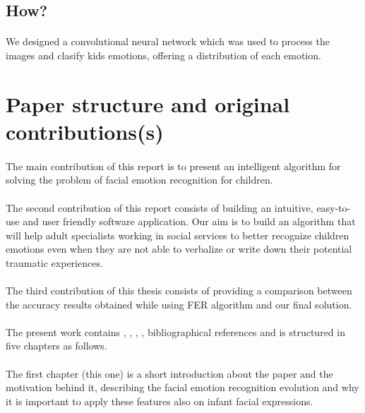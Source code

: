 \documentclass[runningheads,a4paper,11pt]{report}
\begin{document}
\subsection{How?}
\label{subsection:how}
\paragraph{}
We designed a convolutional neural network which was used to process the images and clasify kids emotions, offering a distribution of each emotion.

\section{Paper structure and original contributions(s)}
\label{section:structure}
\paragraph{}
The main contribution of this report is to present an intelligent algorithm for solving the problem of facial emotion recognition for children.

\paragraph{}
The second contribution of this report consists of building an intuitive, easy-to-use and user friendly software application. Our aim is to build an algorithm that will help adult specialists working in social services to better recognize children emotions even when they are not able to verbalize or write down their potential traumatic experiences.

\paragraph{}
The third contribution of this thesis consists of providing a comparison between the accuracy results obtained while using FER algorithm and our final solution.

\paragraph{}
The present work contains \cite{LoBlue2015}, \cite{Camras1996}, \cite{Kasari2001}, \cite{Bal2010}, \cite{Revina2018} bibliographical references and is structured in five chapters as follows.

\paragraph{}
The first chapter (this one) is a short introduction about the paper and the motivation behind it, describing the facial emotion recognition evolution and why it is important to apply these features also on infant facial expressions.
\end{document}
